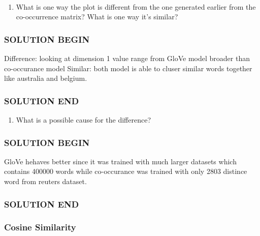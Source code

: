 \documentclass[11pt]{article}
\providecommand{\tightlist}{%
      \setlength{\itemsep}{0pt}\setlength{\parskip}{0pt}}
\begin{document}
    \begin{center}
    \end{center}
    { \hspace*{\fill} \\}
    
    \begin{enumerate}
\def\labelenumi{\alph{enumi}.}
\tightlist
\item
  What is one way the plot is different from the one generated earlier
  from the co-occurrence matrix? What is one way it's similar?
\end{enumerate}

    \subsubsection{SOLUTION BEGIN}\label{solution-begin}

Difference: looking at dimension 1 value range from GloVe model broader
than co-occurance model Similar: both model is able to cluser similar
words together like australia and belgium.

\subsubsection{SOLUTION END}\label{solution-end}

    \begin{enumerate}
\def\labelenumi{\alph{enumi}.}
\setcounter{enumi}{1}
\tightlist
\item
  What is a possible cause for the difference?
\end{enumerate}

    \subsubsection{SOLUTION BEGIN}\label{solution-begin}

GloVe hehaves better since it was trained with much larger datasets
which contains 400000 words while co-occurance was trained with only
2803 distince word from reuters dataset.

\subsubsection{SOLUTION END}\label{solution-end}

    \subsubsection{Cosine Similarity}\label{cosine-similarity}
\end{document}
